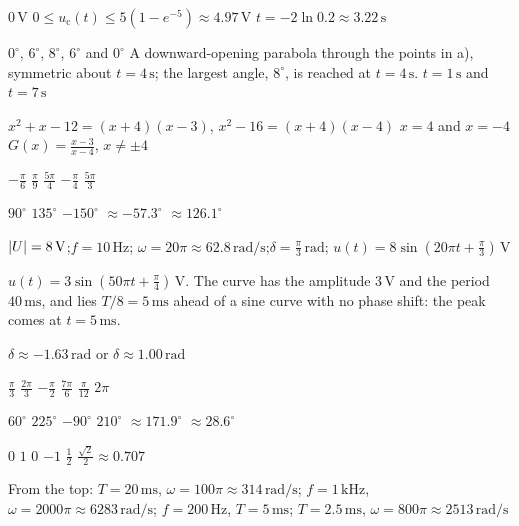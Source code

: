 
\begin{facit}

  $0\,\text{V}$
 $0 \leq u_{\text{c}}(t) \leq 5(1 - e^{-5}) \approx 4.97\,\text{V}$
 $t = -2\ln 0.2 \approx 3.22\,\text{s}$

  $0^{\circ}$, $6^{\circ}$, $8^{\circ}$, $6^{\circ}$ and $0^{\circ}$
 A downward-opening parabola through the points in a), symmetric about $t = 4\,\text{s}$;
the largest angle, $8^{\circ}$, is reached at $t = 4\,\text{s}$.
 $t = 1\,\text{s}$ and $t = 7\,\text{s}$

  $x^2 + x - 12 = (x + 4)(x - 3)$, $x^2 - 16 = (x + 4)(x - 4)$
 $x = 4$ and $x = -4$
 $G(x) = \frac{x - 3}{x - 4}$, $x \neq \pm 4$

  $-\frac{\pi}{6}$  $\frac{\pi}{9}$  $\frac{5\pi}{4}$
 $-\frac{\pi}{4}$  $\frac{5\pi}{3}$

  $90^{\circ}$  $135^{\circ}$  $-150^{\circ}$
 $\approx -57.3^{\circ}$  $\approx 126.1^{\circ}$

 $\lvert U\rvert = 8\,\text{V}$;\enspace $f = 10\,\text{Hz}$;\enspace
$\omega = 20\pi \approx 62.8\,\text{rad/s}$;\enspace $\delta = \frac{\pi}{3}\,\text{rad}$;\enspace
$u(t) = 8\sin(20\pi t + \frac{\pi}{3})\,\text{V}$

 $u(t) = 3\sin(50\pi t + \frac{\pi}{4})\,\text{V}$. The curve has the amplitude
$3\,\text{V}$ and the period $40\,\text{ms}$, and lies $T/8 = 5\,\text{ms}$ ahead of a sine curve
with no phase shift: the peak comes at $t = 5\,\text{ms}$.

 $\delta \approx -1.63\,\text{rad}$ or $\delta \approx 1.00\,\text{rad}$

  $\frac{\pi}{3}$  $\frac{2\pi}{3}$  $-\frac{\pi}{2}$
 $\frac{7\pi}{6}$  $\frac{\pi}{12}$  $2\pi$

  $60^{\circ}$  $225^{\circ}$  $-90^{\circ}$  $210^{\circ}$
 $\approx 171.9^{\circ}$  $\approx 28.6^{\circ}$

  $0$  $1$  $0$  $-1$  $\frac{1}{2}$
 $\frac{\sqrt{2}}{2} \approx 0.707$

 From the top: $T = 20\,\text{ms}$, $\omega = 100\pi \approx 314\,\text{rad/s}$;\enspace
$f = 1\,\text{kHz}$, $\omega = 2000\pi \approx 6283\,\text{rad/s}$;\enspace
$f = 200\,\text{Hz}$, $T = 5\,\text{ms}$;\enspace
$T = 2.5\,\text{ms}$, $\omega = 800\pi \approx 2513\,\text{rad/s}$


\end{facit}
